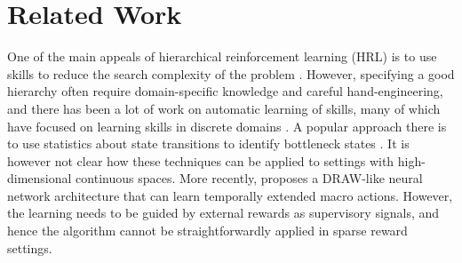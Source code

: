 \documentclass{article} %
\begin{document}





\section{Related Work}

One of the main appeals of hierarchical reinforcement learning (HRL) is to use skills to reduce the search complexity of the problem \citep{parr1998reinforcement, sutton1999between, dietterich2000hierarchical}.
However, specifying a good hierarchy often require domain-specific knowledge and careful hand-engineering, and there has been a lot of work on automatic learning of skills, many of which have focused on learning skills in discrete domains \citep{chentanez2004intrinsically, vigorito2010intrinsically}.
A popular approach there is to use statistics about state transitions to identify bottleneck states \citep{stolle2002learning, mannor2004dynamic, csimcsek2005identifying}.
It is however not clear how these techniques can be applied to settings with high-dimensional continuous spaces.
More recently, \cite{mnih2016strategic} proposes a DRAW-like \citep{gregor2015draw} neural network architecture that can learn temporally extended macro actions.
However, the learning needs to be guided by external rewards as supervisory signals, and hence the algorithm cannot be straightforwardly applied in sparse reward settings.%
\end{document}
